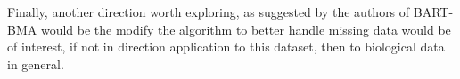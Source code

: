 \documentclass[journal]{IEEEtran}
\begin{document}
Finally, another direction worth exploring, as suggested by the authors of BART-BMA would be the modify the algorithm to better handle missing data would be of interest, if not in direction application to this dataset, then to biological data in general.


%
%



%
%
\end{document}
